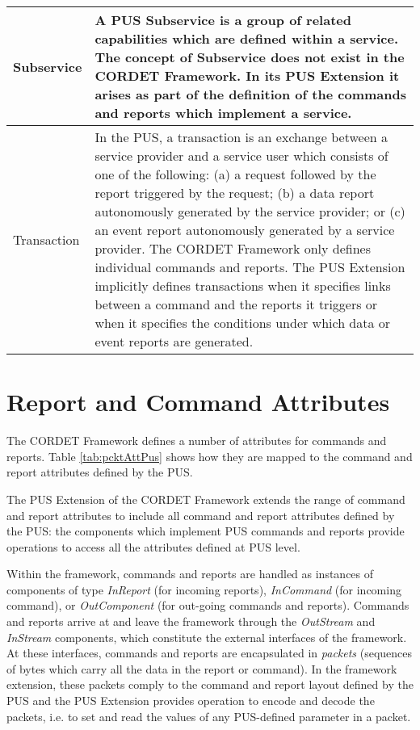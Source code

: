 \documentclass{pnp_article}
\begin{document}
\begin{longtable}{|l|>{\raggedright\arraybackslash}p{10cm}|}
\hline
Subservice & A PUS Subservice is a group of related capabilities which are defined within a service. The concept of Subservice does not exist in the CORDET Framework. In its PUS Extension it arises as part of the definition of the commands and reports which implement a service. \\
\hline
Transaction & In the PUS, a transaction is an exchange between a service provider and a service user which consists of one of the following: (a) a request followed by the report triggered by the request; (b) a data report autonomously generated by the service provider; or (c) an event report autonomously generated by a service provider. The CORDET Framework only defines individual commands and reports. The PUS Extension implicitly defines transactions when it specifies links between a command and the reports it triggers or when it specifies the conditions under which data or event reports are generated. \\
\hline
\end{longtable} 


\section{Report and Command Attributes}\label{sec:repCmdAttr}
The CORDET Framework defines a number of attributes for commands and reports. Table \ref{tab:pcktAttPus} shows how they are mapped to the command and report attributes defined by the PUS. 

The PUS Extension of the CORDET Framework extends the range of command and report attributes to include all command and report attributes defined by the PUS: the components which implement PUS commands and reports provide operations to access all the attributes defined at PUS level. 

Within the framework, commands and reports are handled as instances of components of type \textit{InReport} (for incoming reports), \textit{InCommand} (for incoming command), or \textit{OutComponent} (for out-going commands and reports). Commands and reports arrive at and leave the framework through the \textit{OutStream} and \textit{InStream} components, which constitute the external interfaces of the framework. At these interfaces, commands and reports are encapsulated in \textit{packets} (sequences of bytes which carry all the data in the report or command). In the framework extension, these packets comply to the command and report layout defined by the PUS and the PUS Extension provides operation to encode and decode the packets, i.e. to set and read the values of any PUS-defined parameter in a packet. 
\end{document}
